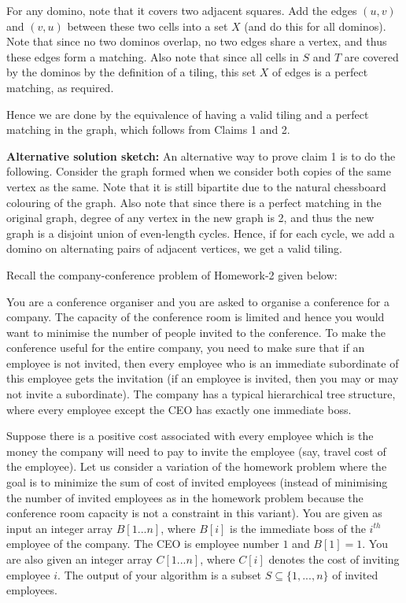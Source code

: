 \documentclass[answers]{exam}
\begin{document}
\begin{questions}
\begin{solution}
        For any domino, note that it covers two adjacent squares. Add the edges $(u, v)$ and $(v, u)$ between these two cells into a set $X$ (and do this for all dominos). Note that since no two
        dominos overlap, no two edges share a vertex, and thus these edges form a matching. Also note that since all cells in $S$ and $T$ are covered by the dominos by the definition of a tiling, this
        set $X$ of edges is a perfect matching, as required.

Hence we are done by the equivalence of having a valid tiling and a perfect matching in the graph, which follows from Claims 1 and 2.

    \textbf{Alternative solution sketch:} An alternative way to prove claim 1 is to do the following. Consider the graph formed when we consider both copies of the same vertex as the same. Note that it
        is still bipartite due to the natural chessboard colouring of the graph. Also note that since there is a perfect matching in the original graph, degree of any vertex in the new graph is 2,
        and thus the new graph is a disjoint union of even-length cycles. Hence, if for each cycle, we add a domino on alternating pairs of adjacent vertices, we get a valid tiling.
    \end{solution}

\question[7]

Recall the company-conference problem of Homework-2 given below:

    You are a conference organiser and you are asked to organise a conference for a company. The capacity of the conference room is limited and hence you would want to minimise the number of people invited to the conference. To make the conference useful for the entire company, you need to make sure that if an employee is not invited, then every employee who is an immediate subordinate of this employee gets the invitation (if an employee is invited, then you may or may not invite a subordinate). The company has a typical hierarchical tree structure, where every employee except the CEO has exactly one immediate boss.

Suppose there is a positive cost associated with every employee which is the money the company will need to pay to invite the employee (say, travel cost of the employee). Let us consider a variation
of the homework problem where the goal is to minimize the sum of cost of invited employees (instead of minimising the number of invited employees as in the homework problem because the conference room
capacity is not a constraint in this variant). You are given as input an integer array $B[1...n]$, where $B[i]$ is the immediate boss of the $i^{th}$ employee of the company. The CEO is employee
number $1$ and $B[1]=1$. You are also given an integer array $C[1...n]$, where $C[i]$ denotes the cost of inviting employee $i$. The output of your algorithm is a subset $S \subseteq \{1, ..., n\}$ of invited employees. 


\end{questions}
\end{document}
